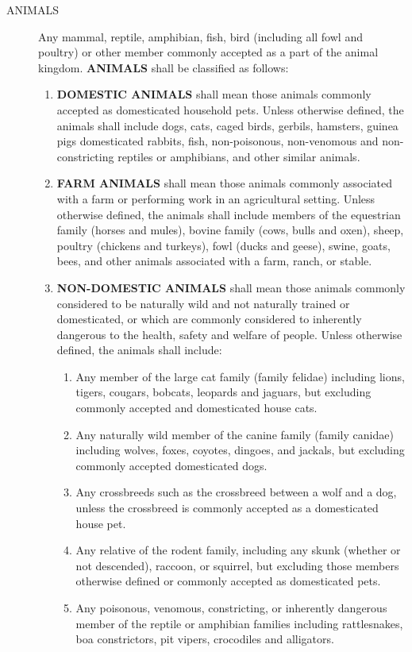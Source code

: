 \begin{description}
    \item[ANIMALS] Any mammal, reptile, amphibian, fish, bird (including all fowl and poultry) or other member commonly accepted as a part of the animal kingdom.  \textbf{ANIMALS} shall be classified as follows:
    \begin{enumerate}[{\indent}1)]
        \item \textbf{DOMESTIC ANIMALS} shall mean those animals commonly accepted as domesticated household pets.  Unless otherwise defined, the animals shall include dogs, cats, caged birds, gerbils, hamsters, guinea pigs domesticated rabbits, fish, non-poisonous, non-venomous and non-constricting reptiles or amphibians, and other similar animals.
        \item \textbf{FARM ANIMALS} shall mean those animals commonly associated with a farm or performing work in an agricultural setting.  Unless otherwise defined, the animals shall include members of the equestrian family (horses and mules), bovine family (cows, bulls and oxen), sheep, poultry (chickens and turkeys), fowl (ducks and geese), swine, goats, bees, and other animals associated with a farm, ranch, or stable.
        \item \textbf{NON-DOMESTIC ANIMALS} shall mean those animals commonly considered to be naturally wild and not naturally trained or domesticated, or which are commonly considered to inherently dangerous to the health, safety and welfare of people.  Unless otherwise defined, the animals shall include:
        \begin{enumerate}
            \item Any member of the large cat family (family felidae) including lions, tigers, cougars, bobcats, leopards and jaguars, but excluding commonly accepted and domesticated house cats.
            \item Any naturally wild member of the canine family (family canidae) including wolves, foxes, coyotes, dingoes, and jackals, but excluding commonly accepted domesticated dogs.
            \item Any crossbreeds such as the crossbreed between a wolf and a dog, unless the crossbreed is commonly accepted as a domesticated house pet.
            \item Any relative of the rodent family, including any skunk (whether or not descended), raccoon, or squirrel, but excluding those members otherwise defined or commonly accepted as domesticated pets.
            \item Any poisonous, venomous, constricting, or inherently dangerous member of the reptile or amphibian families including rattlesnakes, boa constrictors, pit vipers, crocodiles and alligators.

\end{enumerate}
\end{enumerate}
\end{description}
